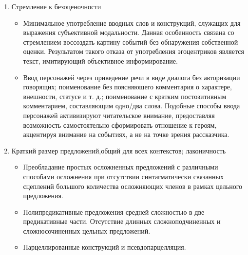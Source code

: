 \documentclass{kursa4}
\begin{document}
  \begin{enumerate}
    \item{Стремление к безоценочности}
    \begin{itemize}
      \item{Минимальное употребление вводных слов и конструкций, служащих для выражения субъективной модальности. Данная особенность связана со стремлением воссоздать картину событий без обнаружения собственной оценки. Результатом такого отказа от употребления эгоцентриков является текст, имитирующий объективное информирование.} 
      \item{Ввод персонажей через приведение речи в виде диалога без авторизации говорящих; поименование без поясняющего комментария о характере, внешности, статусе и т. д.; поименование с кратким постозитивным комментарием, составляющим одно/два слова. Подобные способы ввода персонажей активизируют читательское внимание, предоставляя возможность самостоятельно сформировать отношение к героям, акцентируя внимание на событиях, а не на точке зрения рассказчика.}
    \end{itemize}

    \item{Краткий размер предложений,общий для всех контекстов; лаконичность}
    \begin{itemize}
      \item{Преобладание простых осложненных предложений с различными способами осложнения при отсутствии синтагматически связанных сцеплений большого количества осложняющих членов в рамках цельного предложения.}
      \item{Полипредикативные предложения средней сложностью в две предикативные части. Отсутствие длинных сложноподчиненных и сложносочиненных цельных предложений.}
      \item{Парцеллированные конструкций и псевдопарцелляция. }
    \end{itemize}


\end{enumerate}
\end{document}
